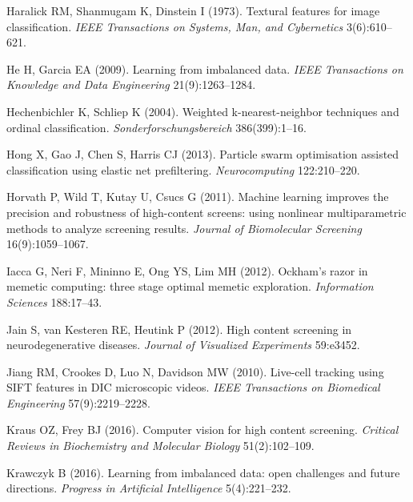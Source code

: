 \begin{thebibliography}{110}
Haralick RM, Shanmugam K, Dinstein I (1973). Textural features for image
  classification. \emph{IEEE Transactions on Systems, Man, and Cybernetics}
  3(6):610--621.

He H, Garcia EA (2009). Learning from imbalanced data. \emph{IEEE Transactions
  on Knowledge and Data Engineering} 21(9):1263--1284.

Hechenbichler K, Schliep K (2004). Weighted k-nearest-neighbor techniques and
  ordinal classification. \emph{Sonderforschungsbereich} 386(399):1--16.

Hong X, Gao J, Chen S, Harris CJ (2013). Particle swarm optimisation assisted
  classification using elastic net prefiltering. \emph{Neurocomputing}
  122:210--220.

Horvath P, Wild T, Kutay U, Csucs G (2011). Machine learning improves the
  precision and robustness of high-content screens: using nonlinear
  multiparametric methods to analyze screening results. \emph{Journal of
  Biomolecular Screening} 16(9):1059--1067.

Iacca G, Neri F, Mininno E, Ong YS, Lim MH (2012). Ockham's razor in memetic
  computing: three stage optimal memetic exploration. \emph{Information
  Sciences} 188:17--43.

Jain S, van Kesteren RE, Heutink P (2012). High content screening in
  neurodegenerative diseases. \emph{Journal of Visualized Experiments}
  59:e3452.

Jiang RM, Crookes D, Luo N, Davidson MW (2010). Live-cell tracking using {SIFT}
  features in {DIC} microscopic videos. \emph{IEEE Transactions on Biomedical
  Engineering} 57(9):2219--2228.

Kraus OZ, Frey BJ (2016). Computer vision for high content screening.
  \emph{Critical Reviews in Biochemistry and Molecular Biology} 51(2):102--109.

Krawczyk B (2016). Learning from imbalanced data: open challenges and future
  directions. \emph{Progress in Artificial Intelligence} 5(4):221--232.


\end{thebibliography}
